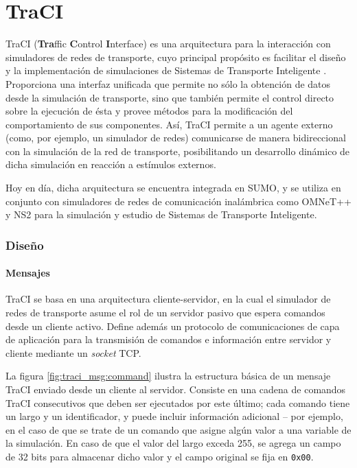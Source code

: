 \chapter{TraCI} \label{anex:traci}

TraCI (\textbf{Tra}ffic \textbf{C}ontrol \textbf{I}nterface) es una arquitectura para la interacción con simuladores de redes de transporte, cuyo principal propósito es facilitar el diseño y la implementación de simulaciones de Sistemas de Transporte Inteligente \autocite{traci}. Proporciona una interfaz unificada que permite no sólo la obtención de datos desde la simulación de transporte, sino que también permite el control directo sobre la ejecución de ésta y provee métodos para la modificación del comportamiento de sus componentes. Así, TraCI permite a un agente externo (como, por ejemplo, un simulador de redes) comunicarse de manera bidireccional con la simulación de la red de transporte, posibilitando un desarrollo dinámico de dicha simulación en reacción a estímulos externos.

Hoy en día, dicha arquitectura se encuentra integrada en SUMO, y se utiliza en conjunto con simuladores de redes de comunicación inalámbrica como OMNeT++ y NS2 para la simulación y estudio de Sistemas de Transporte Inteligente.

\subsection{Diseño}
\subsubsection{Mensajes}

TraCI se basa en una arquitectura cliente-servidor, en la cual el simulador de redes de transporte asume el rol de un servidor pasivo que espera comandos desde un cliente activo. Define además un protocolo de comunicaciones de capa de aplicación para la transmisión de comandos e información entre servidor y cliente mediante un \emph{socket} TCP.

La figura \ref{fig:traci_msg:command} ilustra la estructura básica de un mensaje TraCI enviado desde un cliente al servidor. Consiste en una cadena de comandos TraCI consecutivos que deben ser ejecutados por este último; cada comando tiene un largo y un identificador, y puede incluir información adicional -- por ejemplo, en el caso de que se trate de un comando que asigne algún valor a una variable de la simulación. En caso de que el valor del largo exceda 255, se agrega un campo de 32 bits para almacenar dicho valor y el campo original se fija en \texttt{0x00}.

